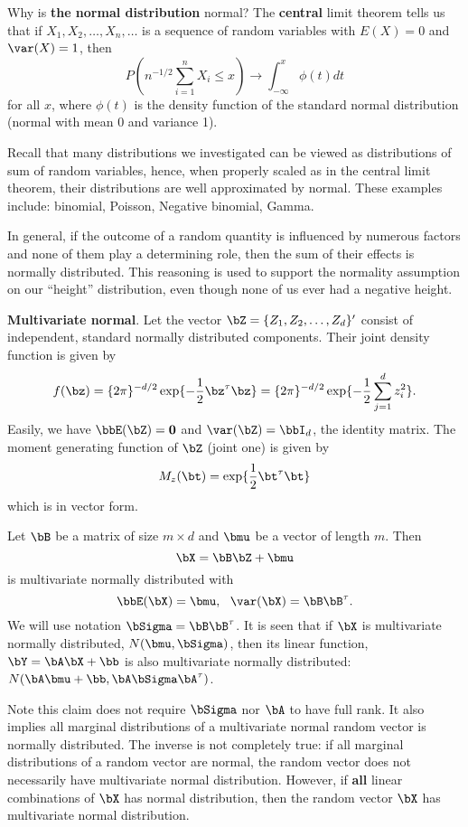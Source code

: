 Why is {\bf the normal distribution} normal?
The {\bf central} limit theorem tells us that
if $X_1, X_2, \ldots, X_n, \ldots$ is a sequence
of \iid random variables with $E(X) = 0$ and
$\var(X) =1$, then
\[
P( n^{-1/2} \sum_{i=1}^n X_i \leq x) 
\to \int_{-\infty}^x \phi(t) dt
\]
for all $x$, where $\phi(t)$ is the density function
of the standard normal distribution (normal with mean 0
and variance 1).

Recall that many distributions we investigated can be
viewed as distributions of sum of \iid random variables,
hence, when properly scaled as in the central limit theorem, 
their distributions are well approximated by normal. 
These examples include: binomial, Poisson, Negative binomial, Gamma.

In general, if the outcome of a random quantity is
influenced by numerous factors and none of them play
a determining role, then the sum of their effects is
normally distributed. This reasoning is used to support
the normality assumption on our ``height'' distribution,
even though none of us ever had a negative height.

\vspace{1em}
\noindent
{\bf Multivariate normal}.
Let the vector
${\bZ}=\{Z_1, Z_2, \ldots, Z_d\}'$ consist of independent, 
standard normally distributed components. 
Their joint density function is given by
\[
f(\bz)
=
\{ 2\pi\}^{-d/2} \exp \{ - \frac{1}{2} \bz^\tau \bz \}
=
\{ 2\pi\}^{-d/2} \exp \{ - \frac{1}{2} \sum_{j=1}^d z_i^2\}.
\]
Easily, we have
$\bbE({\bZ}) ={\bf 0}$ and $\var(\bZ) = \bbI_d$, the identity matrix.
The moment generating function of $\bZ$ (joint one) is given by
\[
M_z(\bt) = \exp \{ \frac{1}{2} \bt^\tau \bt\}
\]
which is in vector form.

Let $\bB$ be a matrix of size $m \times d$ and $\bmu$ be a vector of
length $m$. 
Then
\[
\bX = \bB\bZ + \bmu
\]
is multivariate normally distributed with
\[
\bbE(\bX) = \bmu, ~~\var(\bX) = \bB\bB^\tau.
\]
We will use notation $\bSigma = \bB\bB^\tau$.
It is seen that if $\bX$ is multivariate normally
distributed, $N(\bmu, \bSigma)$, then its linear function,
$\bY = \bA\bX + \bb$ is also multivariate normally distributed:
$N(\bA \bmu + \bb, \bA \bSigma \bA^\tau)$.


Note this claim does not require $\bSigma$ nor $\bA$ to have
full rank. It also implies all marginal distributions of a
multivariate normal random vector is normally distributed.
The inverse is not completely true: if all marginal
distributions of a random vector are normal, the
random vector does not necessarily have multivariate
normal distribution. However, if {\bf all} linear
combinations of $\bX$ has normal distribution, then
the random vector $\bX$ has multivariate normal
distribution.

